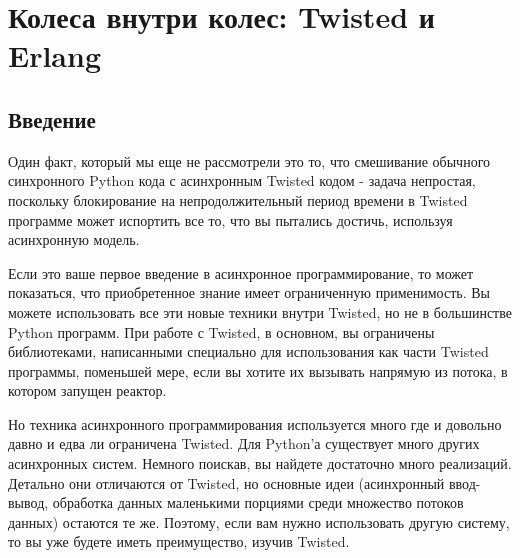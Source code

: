 
\section{Колеса внутри колес: Twisted и Erlang\label{sec:part20}}

\subsection{Введение}

Один факт, который мы еще не рассмотрели это то, что смешивание 
обычного синхронного Python кода с асинхронным Twisted кодом - задача 
непростая, поскольку блокирование на непродолжительный период времени в 
Twisted программе может испортить все то, что 
вы пытались достичь, используя асинхронную модель.   


Если это ваше первое введение в асинхронное программирование, то 
может показаться, что приобретенное знание имеет ограниченную применимость.  
Вы можете использовать все эти новые техники внутри Twisted, 
но не в большинстве Python программ. При работе с Twisted, в основном, 
вы ограничены библиотеками, написанными специально для 
использования как части Twisted программы, поменьшей мере, 
если вы хотите их вызывать напрямую из потока, в котором 
запущен реактор.  


Но техника асинхронного программирования используется много где и 
довольно давно и едва ли ограничена Twisted. Для Python'а существует 
много других асинхронных систем. Немного поискав, вы найдете достаточно 
много реализаций. Детально они отличаются от Twisted, но основные 
идеи (асинхронный ввод-вывод, обработка данных маленькими порциями среди 
множество потоков данных) остаются те же. Поэтому, если вам нужно 
использовать другую систему, то вы уже будете иметь преимущество, 
изучив Twisted.  


